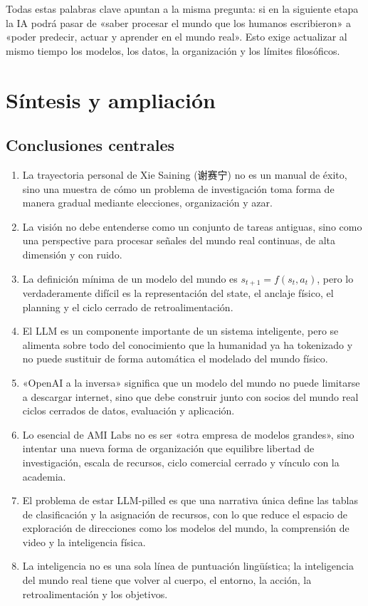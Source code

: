 \documentclass[a4paper]{article}
\begin{document}
Todas estas palabras clave apuntan a la misma pregunta: si en la siguiente etapa la IA podrá pasar de «saber procesar el mundo que los humanos escribieron» a «poder predecir, actuar y aprender en el mundo real». Esto exige actualizar al mismo tiempo los modelos, los datos, la organización y los límites filosóficos.

\section{Síntesis y ampliación}

\subsection{Conclusiones centrales}

\begin{enumerate}
\item La trayectoria personal de Xie Saining (谢赛宁) no es un manual de éxito, sino una muestra de cómo un problema de investigación toma forma de manera gradual mediante elecciones, organización y azar.
\item La visión no debe entenderse como un conjunto de tareas antiguas, sino como una perspective para procesar señales del mundo real continuas, de alta dimensión y con ruido.
\item La definición mínima de un modelo del mundo es $s_{t+1}=f(s_t,a_t)$, pero lo verdaderamente difícil es la representación del state, el anclaje físico, el planning y el ciclo cerrado de retroalimentación.
\item El LLM es un componente importante de un sistema inteligente, pero se alimenta sobre todo del conocimiento que la humanidad ya ha tokenizado y no puede sustituir de forma automática el modelado del mundo físico.
\item «OpenAI a la inversa» significa que un modelo del mundo no puede limitarse a descargar internet, sino que debe construir junto con socios del mundo real ciclos cerrados de datos, evaluación y aplicación.
\item Lo esencial de AMI Labs no es ser «otra empresa de modelos grandes», sino intentar una nueva forma de organización que equilibre libertad de investigación, escala de recursos, ciclo comercial cerrado y vínculo con la academia.
\item El problema de estar LLM-pilled es que una narrativa única define las tablas de clasificación y la asignación de recursos, con lo que reduce el espacio de exploración de direcciones como los modelos del mundo, la comprensión de video y la inteligencia física.
\item La inteligencia no es una sola línea de puntuación lingüística; la inteligencia del mundo real tiene que volver al cuerpo, el entorno, la acción, la retroalimentación y los objetivos.
\end{enumerate}
\end{document}
